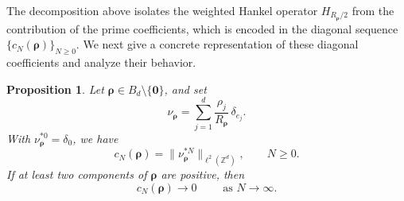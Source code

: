 \documentclass[12pt, reqno]{amsart}
\numberwithin{equation}{section}
\newtheorem{proposition}[theorem]{Proposition}
\begin{document}
The decomposition above isolates the weighted Hankel operator
$H_{R_{\boldsymbol{\rho}}/2}$ from the contribution of the prime
coefficients, which is encoded in the diagonal sequence
$\{c_N(\boldsymbol{\rho})\}_{N\ge0}$. We next give a concrete
representation of these diagonal coefficients and analyze their
behavior.


\begin{proposition}\label{prop:conv}
Let \(\boldsymbol\rho\in B_d\setminus\{\boldsymbol0\}\), and set
\[
\nu_{\boldsymbol\rho}
=
\sum_{j=1}^d
\frac{\rho_j}{R_{\boldsymbol\rho}}\,\delta_{e_j}.
\]
With \(\nu_{\boldsymbol\rho}^{*0}=\delta_0\), we have
\[
c_N(\boldsymbol\rho)
=
\|\nu_{\boldsymbol\rho}^{*N}\|_{\ell^2(\mathbb Z^d)},
\qquad N\geq0.
\]
If at least two components of \(\boldsymbol\rho\) are positive, then
\[
c_N(\boldsymbol\rho)\longrightarrow0 \qquad \text{ as } N \longrightarrow \infty .
\]
\end{proposition}
\end{document}
